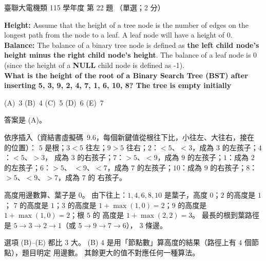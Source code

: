 \begin{pastexam}[label={px:ust-115-ee-ds-22}]{臺聯大電機類 115 學年度 第 22 題}
（單選；2 分）

\textbf{Height:} Assume that the height of a tree node is the number of edges on the longest path
from the node to a leaf. A leaf node will have a height of 0.\\
\textbf{Balance:} The balance of a binary tree node is defined as \textbf{the left child node's
height minus the right child node's height}. The balance of a leaf node is 0 (since the height of a
\textbf{NULL} child node is defined as -1).\\
\textbf{What is the height of the root of a Binary Search Tree (BST) after inserting 5, 3, 9, 2, 4,
7, 1, 6, 10, 8? The tree is empty initially}

(A)~3 \qquad (B)~4 \qquad (C)~5 \qquad (D)~6 \qquad (E)~7
\end{pastexam}

\begin{pastsoln}
答案是 (A)。

依序插入（資結書虛擬碼~9.6，每個新鍵值從根往下比，小往左、大往右，接在 \NIL 的位置）：
$5$ 是根；$3 < 5$ 往左；$9 > 5$ 往右；$2$：$< 5$、$< 3$，成為 $3$ 的左孩子；$4$：$< 5$、$> 3$，
成為 $3$ 的右孩子；$7$：$> 5$、$< 9$，成為 $9$ 的左孩子；$1$：成為 $2$ 的左孩子；$6$：$> 5$、
$< 9$、$< 7$，成為 $7$ 的左孩子；$10$：成為 $9$ 的右孩子；$8$：$> 5$、$< 9$、$> 7$，成為 $7$ 的
右孩子。
\begin{center}
\end{center}
高度用邊數算、葉子是 $0$。 由下往上：$1, 4, 6, 8, 10$ 是葉子，高度 $0$；$2$ 的高度是 $1$；
$7$ 的高度是 $1$；$3$ 的高度是 $1 + \max(1, 0) = 2$；$9$ 的高度是 $1 + \max(1, 0) = 2$；根 $5$ 的
高度是 $1 + \max(2, 2) = 3$。 最長的根到葉路徑是 $5 \to 3 \to 2 \to 1$（或 $5 \to 9 \to 7 \to 6$），
$3$ 條邊。

選項 (B)--(E) 都比 $3$ 大。 (B) $4$ 是用「節點數」算高度的結果（路徑上有 $4$ 個節點），題目明定
用邊數。 其餘更大的值不對應任何一種算法。
\end{pastsoln}
